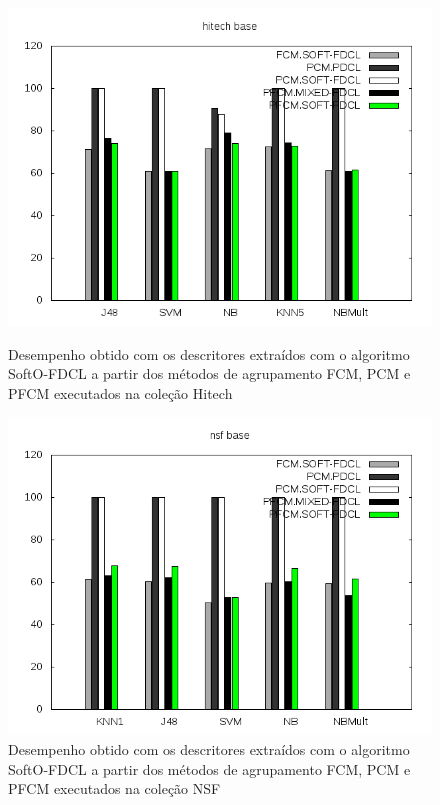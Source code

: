 \begin{figure}[!htp] \centering 
   \begin{minipage}{0.45\textwidth} 
     \centering
    \includegraphics[width=1.0\columnwidth]{assets/pdcl/hitech} 
    \caption{Desempenho obtido com os descritores extraídos com o algoritmo SoftO-FDCL a partir dos
      métodos de agrupamento FCM,
    PCM e PFCM executados na coleção Hitech} 
  \label{fig:pfcmhitech}
  \end{minipage}\hfill 
  \begin{minipage}{0.45\textwidth} \centering
    \includegraphics[width=1.0\columnwidth]{assets/pdcl/nsf} 
    \caption{Desempenho obtido com os descritores extraídos com o algoritmo SoftO-FDCL a partir dos
      métodos de agrupamento FCM,
    PCM e PFCM executados na coleção NSF} 
     \label{fig:pfcmnsf} 
   \end{minipage} 
\end{figure}

